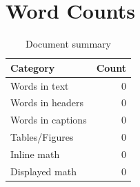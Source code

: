 
\section{Word Counts}
\begin{table}[h!]
\centering
\begin{tabular}{l r}
\textbf{Category} & \textbf{Count} \\
\hline
Words in text & 0 \\
Words in headers & 0 \\
Words in captions & 0 \\
Tables/Figures & 0 \\
Inline math & 0 \\
Displayed math & 0 \\
\end{tabular}
\caption{Document summary}
\end{table}
